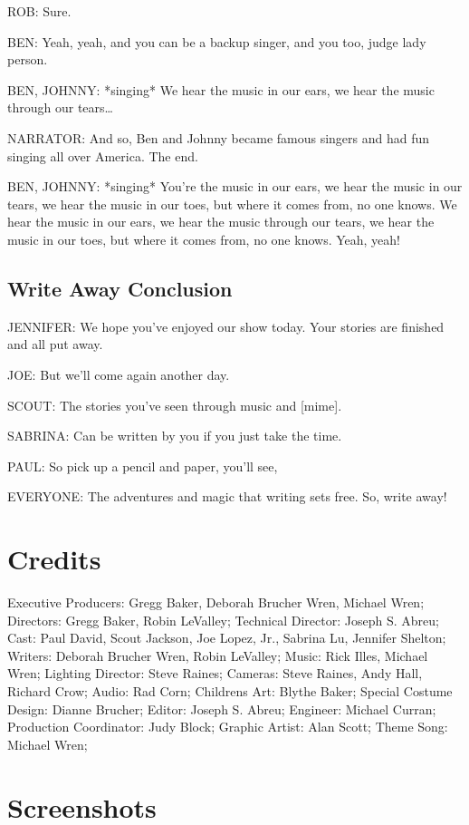 ROB:
Sure.

BEN:
Yeah, yeah, and you can be a backup singer, and you too, judge lady person.

BEN, JOHNNY:
*singing*
We hear the music in our ears, we hear the music through our tears\dots

NARRATOR:
And so, Ben and Johnny became famous singers and had fun singing all over America.
The end.

BEN, JOHNNY:
*singing*
You're the music in our ears, we hear the music in our tears, we hear the music in our toes, but where it comes from, no one knows.
We hear the music in our ears, we hear the music through our tears, we hear the music in our toes, but where it comes from, no one knows.
Yeah, yeah!

\subsection{Write Away Conclusion}

JENNIFER:
We hope you've enjoyed our show today.
Your stories are finished and all put away.

JOE:
But we'll come again another day.

SCOUT:
The stories you've seen through music and [mime].

SABRINA:
Can be written by you if you just take the time.

PAUL:
So pick up a pencil and paper, you'll see,

EVERYONE:
The adventures and magic that writing sets free.
So, write away!

\section{Credits}

Executive Producers: Gregg Baker, Deborah Brucher Wren, Michael Wren;
Directors: Gregg Baker, Robin LeValley;
Technical Director: Joseph S. Abreu;
Cast: Paul David, Scout Jackson, Joe Lopez, Jr., Sabrina Lu, Jennifer Shelton;
Writers: Deborah Brucher Wren, Robin LeValley;
Music: Rick Illes, Michael Wren;
Lighting Director: Steve Raines;
Cameras: Steve Raines, Andy Hall, Richard Crow;
Audio: Rad Corn;
Childrens Art: Blythe Baker;
Special Costume Design: Dianne Brucher;
Editor: Joseph S. Abreu;
Engineer: Michael Curran;
Production Coordinator: Judy Block;
Graphic Artist: Alan Scott;
Theme Song: Michael Wren;

\clearpage
\newpage

\section{Screenshots}

